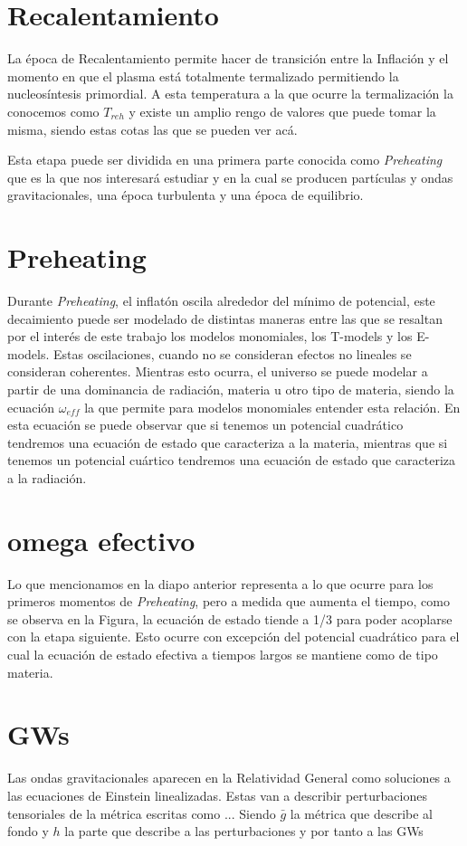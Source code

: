 \documentclass[letterpaper,12pt]{report}
\begin{document}
  \section{Recalentamiento}
    La época de Recalentamiento permite hacer de transición entre la Inflación y el momento en que el plasma está totalmente termalizado permitiendo la nucleosíntesis primordial. A esta temperatura a la que ocurre la termalización la conocemos como $T_{reh}$ y existe un amplio rengo de valores que puede tomar la misma, siendo estas cotas las que se pueden ver acá.

    Esta etapa puede ser dividida en una primera parte conocida como \textit{Preheating} que es la que nos interesará estudiar y en la cual se producen partículas y ondas gravitacionales, una época turbulenta y una época de equilibrio.

  \section{Preheating}
    Durante \textit{Preheating}, el inflatón oscila alrededor del mínimo de potencial, este decaimiento puede ser modelado de distintas maneras entre las que se resaltan por el interés de este trabajo los modelos monomiales, los T-models y los E-models. Estas oscilaciones, cuando no se consideran efectos no lineales se consideran coherentes. Mientras esto ocurra, el universo se puede modelar a partir de una dominancia de radiación, materia u otro tipo de materia, siendo la ecuación $\omega_{eff}$ la que permite para modelos monomiales entender esta relación. En esta ecuación se puede observar que si tenemos un potencial cuadrático tendremos una ecuación de estado que caracteriza a la materia, mientras que si tenemos un potencial cuártico tendremos una ecuación de estado que caracteriza a la radiación.

  \section{omega efectivo}
    Lo que mencionamos en la diapo anterior representa a lo que ocurre para los primeros momentos de \textit{Preheating}, pero a medida que aumenta el tiempo, como se observa en la Figura, la ecuación de estado tiende a 1/3 para poder acoplarse con la etapa siguiente. Esto ocurre con excepción del potencial cuadrático para el cual la ecuación de estado efectiva a tiempos largos se mantiene como de tipo materia.

  \section{GWs}
    Las ondas gravitacionales aparecen en la Relatividad General como soluciones a las ecuaciones de Einstein linealizadas. Estas van a describir perturbaciones tensoriales de la métrica escritas como ... Siendo $\bar{g}$ la métrica que describe al fondo y $h$ la parte que describe a las perturbaciones y por tanto a las GWs 
\end{document}
